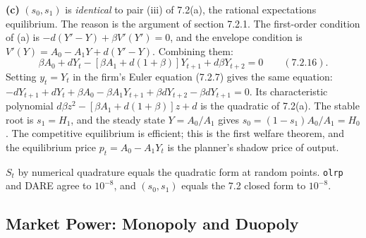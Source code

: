 \documentclass[12pt, letterpaper]{article}
\begin{document}
\begin{tcolorbox}[oddbox,title={Exercise 7.3 \quad Maximizing welfare}]
\textbf{(c)} $(s_0,s_1)$ is \emph{identical} to pair (iii) of 7.2(a), the rational expectations
equilibrium. The reason is the argument of section 7.2.1. The first-order condition of (a) is
$-d(Y'-Y)+\beta V'(Y')=0$, and the envelope condition is $V'(Y)=A_0-A_1Y+d(Y'-Y)$. Combining them:
\[
\beta A_0+dY_t-[\beta A_1+d(1+\beta)]Y_{t+1}+d\beta Y_{t+2}=0 \qquad(7.2.16).
\]
Setting $y_t=Y_t$ in the firm's Euler equation (7.2.7) gives the same equation:
$-dY_{t+1}+dY_t+\beta A_0-\beta A_1Y_{t+1}+\beta dY_{t+2}-\beta dY_{t+1}=0$. Its characteristic
polynomial $d\beta z^2-[\beta A_1+d(1+\beta)]z+d$ is the quadratic of 7.2(a). The stable root is
$s_1=H_1$, and the steady state $Y=A_0/A_1$ gives $s_0=(1-s_1)A_0/A_1=H_0$. The competitive
equilibrium is efficient; this is the first welfare theorem, and the equilibrium price
$p_t=A_0-A_1Y_t$ is the planner's shadow price of output.

\begin{tcolorbox}[databox]
$S_t$ by numerical quadrature equals the quadratic form at random points. \texttt{olrp} and DARE
agree to $10^{-8}$, and $(s_0,s_1)$ equals the 7.2 closed form to $10^{-8}$.
\end{tcolorbox}
\end{tcolorbox}

\subsection{Market Power: Monopoly and Duopoly}
\end{document}
